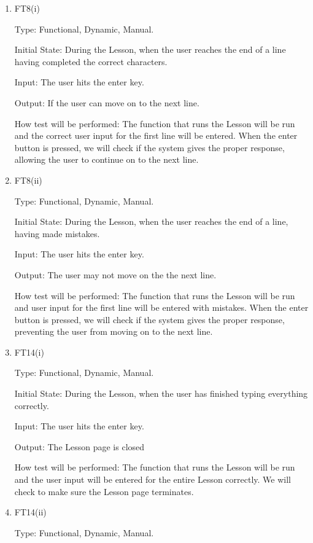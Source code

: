 \documentclass[12pt, titlepage]{article}
\begin{document}
\begin{enumerate}
\item{{\color{cyan}FT8(i)}\\}

{\color{cyan}Type: Functional, Dynamic, Manual.
					
Initial State: During the Lesson, when the user reaches the end of a line having completed the correct characters.
					
Input: The user hits the enter key.
					
Output: If the user can move on to the next line.
					
How test will be performed: The function that runs the Lesson will be run and the correct user input for the first line will be entered. When the enter button is pressed, we will check if the system gives the proper response, allowing the user to continue on to the next line.}

\item{{\color{cyan}FT8}(ii)}
{\color{cyan}
Type: Functional, Dynamic, Manual.
					
Initial State: During the Lesson, when the user reaches the end of a line, having made mistakes.
					
Input: The user hits the enter key.
					
Output: The user may not move on the the next line.
					
How test will be performed: The function that runs the Lesson will be run and user input for the first line will be entered with mistakes. When the enter button is pressed, we will check if the system gives the proper response, preventing the user from moving on to the next line.}

\item{{\color{cyan}FT14(i)}\\}
{\color{cyan}
Type: Functional, Dynamic, Manual.
					
Initial State: During the Lesson, when the user has finished typing everything correctly.
					
Input: The user hits the enter key.
					
Output: The Lesson page is closed
					
How test will be performed: The function that runs the Lesson will be run and the user input will be entered for the entire Lesson correctly. We will check to make sure the Lesson page terminates.}

\item{{\color{cyan}FT14(ii)}\\}
{\color{cyan}
Type: Functional, Dynamic, Manual.
					
}
\end{enumerate}
\end{document}
